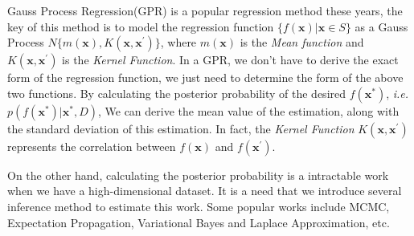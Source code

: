Gauss Process Regression(GPR)\cite{rasmussen2006gaussian} is a popular regression method these years, the key of this method is to model the regression function $\{ f(\textbf{x}) | \textbf{x} \in S\}$ as a Gauss Process $N \{ m(\textbf{x}), K (\textbf{x},\textbf{x}^{'}) \}$, where $m(\textbf{x})$ is the \emph{Mean function} and $K (\textbf{x},\textbf{x}^{'})$ is the \emph{Kernel Function}.
In a GPR, we don't have to derive the exact form of the regression function, we just need to determine the form of the above two functions. 
By calculating the posterior probability of the desired $f(\textbf{x}^{*})$, \emph{i.e.} $p(f(\textbf{x}^{*}) | \textbf{x}^{*}, D)$, We can derive the mean value of the estimation, along with the standard deviation of this estimation. 
In fact, the \emph{Kernel Function} $K (\textbf{x},\textbf{x}^{'})$ represents the correlation between $f(\textbf{x})$ and $f(\textbf{x}^{'})$.

On the other hand, calculating the posterior probability is a intractable work when we have a high-dimensional dataset. It is a need that we introduce several inference method to estimate this work. Some popular works include
MCMC\cite{gamerman1997sampling},
Expectation Propagation\cite{minka2001expectation},
Variational Bayes\cite{palmer2006variational,nickisch2009convex}
and Laplace Approximation\cite{tierney1986accurate},
etc.

